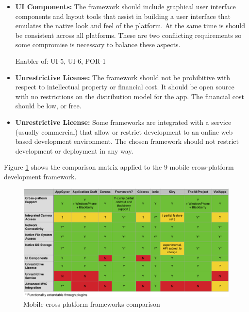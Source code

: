 \begin{itemize}[label={}]
Enabler of: INT-1, INT-2, INT-3, Metadata.Location.*, Metadata.Text.*, Archive.Save, Archive.Browse, Archive.Select.*

\item \textbf{UI Components:} The framework should include graphical user interface components and layout tools that assist in building a user interface that emulates the native look and feel of the platform. At the same time is should be consistent across all platforms. These are two conflicting requirements so some compromise is necessary to balance these aspects.

Enabler of: UI-5, UI-6, POR-1

\item \textbf{Unrestrictive License:} The framework should not be prohibitive with respect to intellectual property or financial cost. It should be open source with no restrictions on the distribution model for the app. The financial cost should be low, or free.

\item \textbf{Unrestrictive License:} Some frameworks are integrated with a service (usually commercial) that allow or restrict development to an online web based development environment. The chosen framework should not restrict development or deployment in any way.

\end{itemize}

Figure \ref{fig:comp_fw} shows the comparison matrix applied to the 9 mobile cross-platform development framework.

\begin{figure}[H]
    \centering
    \includegraphics[width=\textwidth,keepaspectratio]{assets/architecture/framework_comparison.pdf}
    \caption{Mobile cross platform frameworks comparison}
    \label{fig:comp_fw}
\end{figure}
